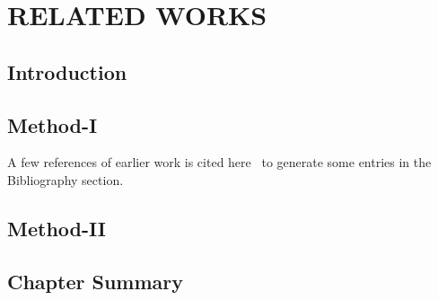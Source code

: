 \chapter{RELATED WORKS}
\label{chap2-related-works}

\section{Introduction}
\label{chap2sec:introduction}





\section{Method-I}
\label{subsec-i}
A few references of earlier work is cited here~\cite{granlund1994signal, jarvis1983perspective} to generate some entries in the Bibliography section.


\section{Method-II}
\label{subsec-ii}


\section{Chapter Summary}
\label{chap2sec:summary}


